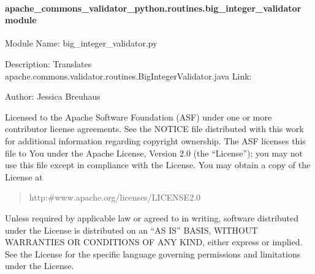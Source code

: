\documentclass[letterpaper,10pt,english]{sphinxmanual}
\begin{document}
\paragraph{apache\_commons\_validator\_python.routines.big\_integer\_validator module}
\label{\detokenize{apache_commons_validator_python.routines:module-apache_commons_validator_python.routines.big_integer_validator}}\label{\detokenize{apache_commons_validator_python.routines:apache-commons-validator-python-routines-big-integer-validator-module}}
\sphinxAtStartPar
Module Name: big\_integer\_validator.py

\sphinxAtStartPar
Description: Translates apache.commons.validator.routines.BigIntegerValidator.java
Link: 

\sphinxAtStartPar
Author: Jessica Breuhaus
\begin{description}
\sphinxAtStartPar
Licensed to the Apache Software Foundation (ASF) under one or more
contributor license agreements.  See the NOTICE file distributed with
this work for additional information regarding copyright ownership.
The ASF licenses this file to You under the Apache License, Version 2.0
(the “License”); you may not use this file except in compliance with
the License.  You may obtain a copy of the License at
\begin{quote}

\sphinxAtStartPar
http:\#www.apache.org/licenses/LICENSE\sphinxhyphen{}2.0
\end{quote}

\sphinxAtStartPar
Unless required by applicable law or agreed to in writing, software
distributed under the License is distributed on an “AS IS” BASIS,
WITHOUT WARRANTIES OR CONDITIONS OF ANY KIND, either express or implied.
See the License for the specific language governing permissions and
limitations under the License.

\end{description}
\end{document}
